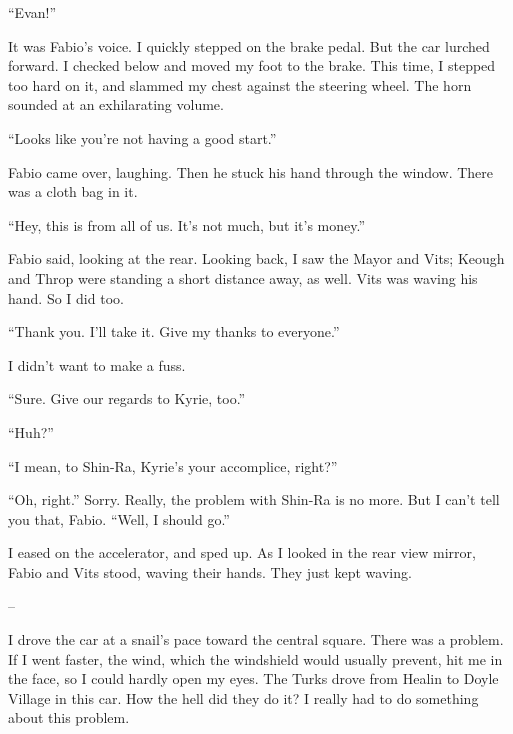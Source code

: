 \documentclass[oneside]{book}
\begin{document}
“Evan!”

It was Fabio’s voice. I quickly stepped on the brake pedal. But the car lurched forward. I checked below and moved my foot to the brake. This time, I stepped too hard on it, and slammed my chest against the steering wheel. The horn sounded at an exhilarating volume.

“Looks like you’re not having a good start.”

Fabio came over, laughing. Then he stuck his hand through the window. There was a cloth bag in it.

“Hey, this is from all of us. It’s not much, but it’s money.”

Fabio said, looking at the rear. Looking back, I saw the Mayor and Vits; Keough and Throp were standing a short distance away, as well. Vits was waving his hand. So I did too.

“Thank you. I’ll take it. Give my thanks to everyone.”

I didn’t want to make a fuss.

“Sure. Give our regards to Kyrie, too.”

“Huh?”

“I mean, to Shin-Ra, Kyrie’s your accomplice, right?”

“Oh, right.” Sorry. Really, the problem with Shin-Ra is no more. But I can’t tell you that, Fabio. “Well, I should go.”

I eased on the accelerator, and sped up. As I looked in the rear view mirror, Fabio and Vits stood, waving their hands. They just kept waving.

–

I drove the car at a snail’s pace toward the central square. There was a problem. If I went faster, the wind, which the windshield would usually prevent, hit me in the face, so I could hardly open my eyes. The Turks drove from Healin to Doyle Village in this car. How the hell did they do it? I really had to do something about this problem.
\end{document}
